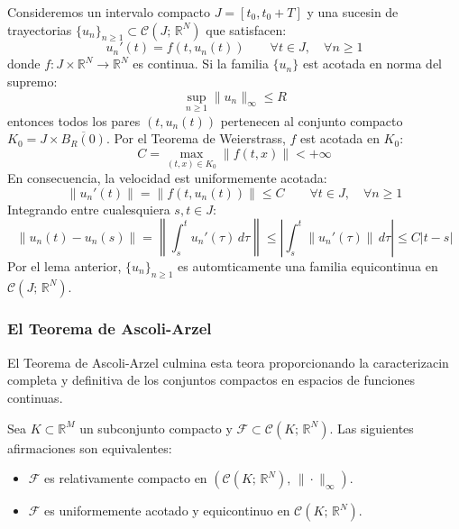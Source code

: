 \begin{observacin}
    Consideremos un intervalo compacto $J = [t_0, t_0 + T]$ y una sucesin de trayectorias $\{u_n\}_{n \geq 1} \subset \mathcal{C}(J; \, \mathbb{R}^N)$ que satisfacen:
    \[
        u_n'(t) = f(t, u_n(t)) \qquad \forall t \in J, \quad \forall n \geq 1
    \]
    donde $f: J \times \mathbb{R}^N \to \mathbb{R}^N$ es continua. Si la familia $\{u_n\}$ est acotada en norma del supremo:
    \[
        \sup_{n \geq 1} \|u_n\|_\infty \leq R
    \]
    entonces todos los pares $(t, u_n(t))$ pertenecen al conjunto compacto $K_0 = J \times \overline{B_R(0)}$. Por el Teorema de Weierstrass, $f$ est acotada en $K_0$:
    \[
        C = \max_{(t, x) \in K_0} \|f(t, x)\| < +\infty
    \]
    En consecuencia, la velocidad est uniformemente acotada:
    \[
        \|u_n'(t)\| = \|f(t, u_n(t))\| \leq C \qquad \forall t \in J, \quad \forall n \geq 1
    \]
    Integrando entre cualesquiera $s, t \in J$:
    \[
        \|u_n(t) - u_n(s)\| = \left\| \int_s^t u_n'(\tau)\, d\tau \right\| \leq \left| \int_s^t \|u_n'(\tau)\|\, d\tau \right| \leq C |t - s|
    \]
    Por el lema anterior, $\{u_n\}_{n \geq 1}$ es automticamente una familia equicontinua en $\mathcal{C}(J; \, \mathbb{R}^N)$.
\end{observacin}

\subsubsection{El Teorema de Ascoli-Arzel}

El Teorema de Ascoli-Arzel culmina esta teora proporcionando la caracterizacin completa y definitiva de los conjuntos compactos en espacios de funciones continuas.

\begin{teorema}
    Sea $K \subset \mathbb{R}^M$ un subconjunto compacto y $\mathcal{F} \subset \mathcal{C}(K; \, \mathbb{R}^N)$. Las siguientes afirmaciones son equivalentes:
    \begin{itemize}
        \item $\mathcal{F}$ es relativamente compacto en $(\mathcal{C}(K; \, \mathbb{R}^N), \, \|\cdot\|_\infty)$.
        \item $\mathcal{F}$ es uniformemente acotado y equicontinuo en $\mathcal{C}(K; \, \mathbb{R}^N)$.
    \end{itemize}
\end{teorema}

